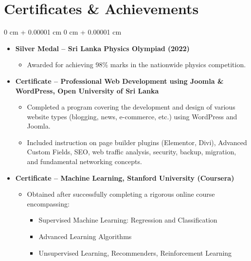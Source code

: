 \documentclass[10pt, letterpaper]{article}
\newenvironment{highlights}{
	\begin{itemize}[
		topsep=0.10 cm,
		parsep=0.10 cm,
		partopsep=0pt,
		itemsep=0pt,
		leftmargin=0 cm + 10pt
		]
	}{
	\end{itemize}
} %
\newenvironment{onecolentry}{
	\begin{adjustwidth}{
			0 cm + 0.00001 cm
		}{
			0 cm + 0.00001 cm
		}
	}{
	\end{adjustwidth}
} %
\begin{document}
	\section{Certificates \& Achievements}
	\begin{onecolentry}
		\begin{highlights}
			\item \textbf{Silver Medal – Sri Lanka Physics Olympiad (2022)}
			\begin{itemize}
				\item Awarded for achieving 98\% marks in the nationwide physics competition.
			\end{itemize}
			\item \textbf{Certificate – Professional Web Development using Joomla \& WordPress, Open University of Sri Lanka}
			\begin{itemize}
				\item Completed a program covering the development and design of various website types (blogging, news, e-commerce, etc.) using WordPress and Joomla.
				\item Included instruction on page builder plugins (Elementor, Divi), Advanced Custom Fields, SEO, web traffic analysis, security, backup, migration, and fundamental networking concepts.
			\end{itemize}
			\item \textbf{Certificate – Machine Learning, Stanford University (Coursera)}
			\begin{itemize}
				\item Obtained after successfully completing a rigorous online course encompassing:
				\begin{itemize}
					\item Supervised Machine Learning: Regression and Classification
					\item Advanced Learning Algorithms
					\item Unsupervised Learning, Recommenders, Reinforcement Learning
				\end{itemize}
			\end{itemize}
		\end{highlights}
	\end{onecolentry}
	
\end{document}
